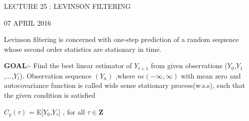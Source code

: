 \documentclass[11pt]{article}
\begin{document}
\begin{center}
\huge{LECTURE 25 : LEVINSON FILTERING}

\large{07 APRIL 2016}
\end{center}


Levinson filtering is concerned with one-step prediction of a random sequence whose second order statistics are stationary in time.\newline

\textbf{GOAL}:-
Find the best linear estimator of ${Y_{t+1}}$ from given observations (${Y_0}$,${Y_1}$,...,${Y_t}$).
Observation sequence $(Y_n)$ ,where $n \epsilon(-\infty,\infty)$ with mean zero and autocovariance function is called wide sense stationary process(w.s.s), such that the given condition is satisfied\newline

$C_y(\tau)$ = E[$Y_0$,$Y_\tau$]  ,     for all        $ \tau \in \mathbf{Z}$\\
\end{document}
